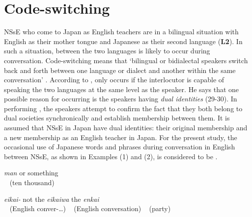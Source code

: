 \documentclass[output=paper]{LSP/langsci}
\begin{document}
\section{Code-switching}
NSsE who come to Japan as English teachers are in a bilingual situation with English as their mother tongue and Japanese as their second language (\textbf{L2}). In such a  situation,  between the two languages is likely to occur during conversation. Code-switching means that ‘bilingual or bidialectal speakers switch back and forth between one language or dialect and another within the same conversation’ \citep[23]{trudgill_glossary_2003}. According to \citet[26]{azuma_shakai_1997},  only occurs if the interlocutor is capable of speaking the two languages at the same level as the speaker. He says that one possible reason for  occurring is the speakers having \textit{dual identities} (29-30). In performing , the speakers attempt to confirm the fact that they both belong to dual societies synchronically and establish membership between them. It is assumed that NSsE in Japan have dual identities: their original membership and a new membership as an English teacher in Japan. For the present study, the occasional use of Japanese words and phrases during conversation in English between NSsE, as shown in Examples (1) and (2), is considered to be .

\ea
{} {\textit{man}} {or something}\\
{~} {(ten thousand)} {~}\\
\z


\ea
{} {\textit{eikai-}}  {not the} {\textit{eikaiwa}}  {the} {\textit{enkai}} \\
{~} {(English conver-\ldots)} {~} {(English conversation)} {~} {(party)}\\
\z

\end{document}
